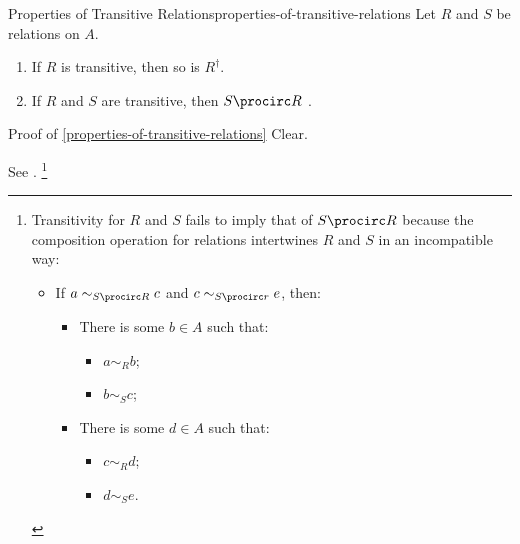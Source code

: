 \begin{proposition}{Properties of Transitive Relations}{properties-of-transitive-relations}%
    Let $R$ and $S$ be relations on $A$.
    \begin{enumerate}
        \item\label{properties-of-transitive-relations-interaction-with-inverses}If $R$ is transitive, then so is $R^{\dagger}$.
        \item\label{properties-of-transitive-relations-interaction-with-composition}If $R$ and $S$ are transitive, then $S\procirc R$ .
    \end{enumerate}
\end{proposition}
\begin{Proof}{Proof of \cref{properties-of-transitive-relations}}%
    Clear.

    See \cite{MSE2096272}.%
    \footnote{%
        Transitivity for $R$ and $S$ fails to imply that of $S\procirc R$ because the composition operation for relations intertwines $R$ and $S$ in an incompatible way:
        \begin{itemize}
            \item If $a\sim_{S\procirc R}c$ and $c\sim_{S\procirc r}e$, then:
                \begin{itemize}
                    \item There is some $b\in A$ such that:
                        \begin{itemize}
                            \item $a\sim_{R}b$;
                            \item $b\sim_{S}c$;
                        \end{itemize}
                    \item There is some $d\in A$ such that:
                        \begin{itemize}
                            \item $c\sim_{R}d$;
                            \item $d\sim_{S}e$.
                        \end{itemize}
                \end{itemize}
        \end{itemize}
        \par\vspace*{-2.25\baselineskip}
    }%
\end{Proof}
